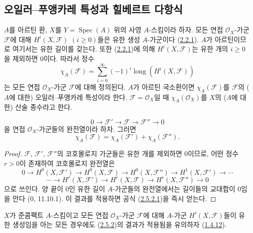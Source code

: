 \subsection{오일러--푸앵카레 특성과 힐베르트 다항식}
\label{subsection:III.2.5-fr}

\begin{env}[2.5.1]
\label{III.2.5.1-fr}
$A$를 아르틴 환, $X$를 $Y=\operatorname{Spec}(A)$ 위의 사영
$A$-스킴이라 하자. 모든 연접 $\mathcal O_X$-가군 $\mathcal F$에 대해
$H^i(X,\mathcal F)$ $(i\geq0)$들은 유한 생성 $A$-가군이다
(\hyperref[III.2.2.1-fr]{2.2.1}). $A$가 아르틴이므로 여기서는 유한
길이를 갖는다. 또한 (\hyperref[III.2.2.1-fr]{2.2.1})에 의해
$H^i(X,\mathcal F)$는 유한 개의 $i\geq0$을 제외하면 0이다. 따라서
정수
\[
\chi_A(\mathcal F)=\sum_{i=0}^{\infty}(-1)^i
\operatorname{long}(H^i(X,\mathcal F))
\tag{2.5.1.1}\label{III.2.5.1.1-fr}
\]
는 모든 연접 $\mathcal O_X$-가군 $\mathcal F$에 대해 정의된다.
$A$가 아르틴 국소환이면 $\chi_A(\mathcal F)$를 $\mathcal F$의
($A$에 대한) 오일러--푸앵카레 특성이라 한다.
$\mathcal F=\mathcal O_X$일 때 $\chi_A(\mathcal O_X)$를 $X$의
($A$에 대한) 산술 종수라고 한다.
\end{env}

\begin{proposition}[2.5.2]
\label{III.2.5.2-fr}
\[
0\longrightarrow\mathcal F'\longrightarrow\mathcal F
\longrightarrow\mathcal F''\longrightarrow0
\]
을 연접 $\mathcal O_X$-가군들의 완전열이라 하자. 그러면
\[
\chi_A(\mathcal F)=\chi_A(\mathcal F')+\chi_A(\mathcal F'').
\tag{2.5.2.1}\label{III.2.5.2.1-fr}
\]
\end{proposition}

\begin{proof}
$\mathcal F$, $\mathcal F'$, $\mathcal F''$의 코호몰로지 가군들은
유한 개를 제외하면 0이므로, 어떤 정수 $r>0$이 존재하여 코호몰로지
완전열은
\[
0\to H^0(X,\mathcal F')\to H^0(X,\mathcal F)
\to H^0(X,\mathcal F'')\to H^1(X,\mathcal F')\to\cdots
\]
\[
\cdots\to H^r(X,\mathcal F')\to H^r(X,\mathcal F)
\to H^r(X,\mathcal F'')\to0
\]
으로 쓰인다. 양 끝이 0인 유한 길이 $A$-가군들의 완전열에서는
길이들의 교대합이 0임을 안다 (0, 11.10.1). 이 결과를 적용하면 공식
(\hyperref[III.2.5.2.1-fr]{2.5.2.1})을 즉시 얻는다.
\end{proof}

$X$가 준콤팩트 $A$-스킴이고 모든 연접 $\mathcal O_X$-가군
$\mathcal F$에 대해 $A$-가군 $H^i(X,\mathcal F)$들이 유한 생성임을
아는 모든 경우에도 (\hyperref[III.2.5.2-fr]{2.5.2})의 결과가 적용됨을
유의하자 (\hyperref[III.1.4.12-fr]{1.4.12}).

